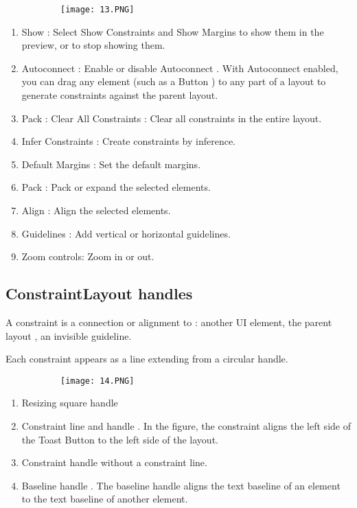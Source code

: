 \documentclass{article}
\begin{document}
  \begin{figure}[ht!]
  \centering
  \begin{subfigure}[b]{0.7\linewidth}
    \texttt{[image: 13.PNG]}
  \end{subfigure}
  \end{figure}

  \begin{enumerate}
      \item Show : Select Show Constraints and Show Margins to show them in the preview, or
to stop showing them.
        \item Autoconnect : Enable or disable Autoconnect . With Autoconnect enabled, you can drag
any element (such as a Button ) to any part of a layout to generate constraints against
the parent layout.
\item Pack : Clear All Constraints : Clear all constraints in the entire layout.
\item Infer Constraints : Create constraints by inference.
\item Default Margins : Set the default margins.
\item Pack : Pack or expand the selected elements.
\item Align : Align the selected elements.
\item Guidelines : Add vertical or horizontal guidelines.
\item Zoom controls: Zoom in or out.
  \end{enumerate}

\vspace{30mm}

  \subsection{ConstraintLayout handles}

  A constraint is a connection or alignment to : another UI element, the parent layout , an invisible guideline.

  Each constraint appears as a line extending from a circular handle.

    \begin{figure}[ht!]
  \centering
  \begin{subfigure}[b]{0.4\linewidth}
    \texttt{[image: 14.PNG]}
  \end{subfigure}
  \end{figure}

  \begin{enumerate}
      \item Resizing square handle
      \item Constraint line and handle . In the
figure, the constraint aligns the left side of
the Toast Button to the left side of the
layout.
      \item Constraint handle without a constraint
line.
      \item Baseline handle . The baseline handle
aligns the text baseline of an element to
the text baseline of another element.
  \end{enumerate}
\end{document}
